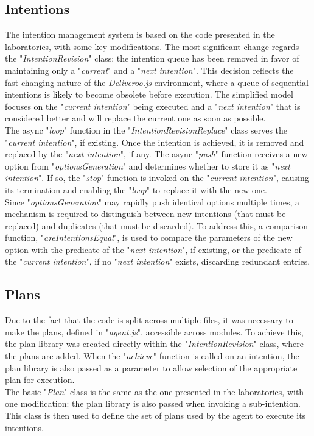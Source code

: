     \subsection{Intentions}
        The intention management system is based on the code presented in the laboratories, with some key modifications. The most significant change regards the "\textit{IntentionRevision}" class: the intention queue has been removed in favor of maintaining only a "\textit{current}" and a "\textit{next intention}". This decision reflects the fast-changing nature of the \textit{Deliveroo.js} environment, where a queue of sequential intentions is likely to become obsolete before execution. The simplified model focuses on the "\textit{current intention}" being executed and a "\textit{next intention}" that is considered better and will replace the current one as soon as possible.
        \medskip\\
        The async "\textit{loop}" function in the "\textit{IntentionRevisionReplace}" class serves the "\textit{current intention}", if existing. Once the intention is achieved, it is removed and replaced by the "\textit{next intention}", if any. The async "\textit{push}" function receives a new option from "\textit{optionsGeneration}" and determines whether to store it as "\textit{next intention}". If so, the "\textit{stop}" function is invoked on the "\textit{current intention}", causing its termination and enabling the "\textit{loop}" to replace it with the new one.
        \medskip\\
        Since "\textit{optionsGeneration}" may rapidly push identical options multiple times, a mechanism is required to distinguish between new intentions (that must be replaced) and duplicates (that must be discarded). To address this, a comparison function, "\textit{areIntentionsEqual}", is used to compare the parameters of the new option with the predicate of the "\textit{next intention}", if existing, or the predicate of the "\textit{current intention}", if no "\textit{next intention}" exists, discarding redundant entries.

    \subsection{Plans}
        Due to the fact that the code is split across multiple files, it was necessary to make the plans, defined in "\textit{agent.js}", accessible across modules. To achieve this, the plan library was created directly within the "\textit{IntentionRevision}" class, where the plans are added. When the "\textit{achieve}" function is called on an intention, the plan library is also passed as a parameter to allow selection of the appropriate plan for execution.
        \medskip\\
        The basic "\textit{Plan}" class is the same as the one presented in the laboratories, with one modification: the plan library is also passed when invoking a sub-intention. This class is then used to define the set of plans used by the agent to execute its intentions.

